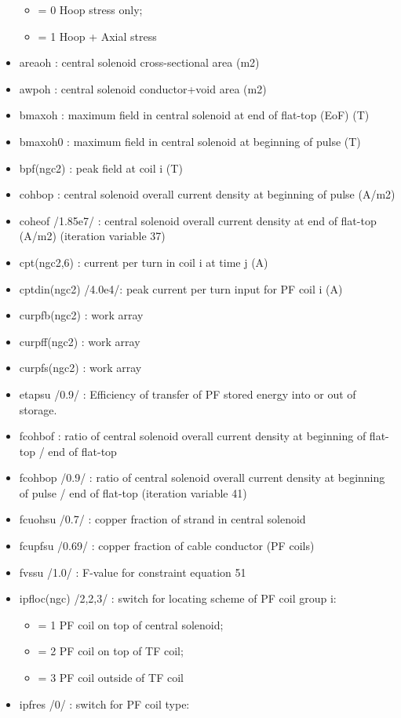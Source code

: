 \documentclass[]{article}
\providecommand{\tightlist}{%
  \setlength{\itemsep}{0pt}\setlength{\parskip}{0pt}}
\begin{document}
\begin{itemize}
  \begin{itemize}
  \tightlist
  \item
    = 0 Hoop stress only;
  \item
    = 1 Hoop + Axial stress
  \end{itemize}
\item
  areaoh : central solenoid cross-sectional area (m2)
\item
  awpoh : central solenoid conductor+void area (m2)
\item
  bmaxoh : maximum field in central solenoid at end of flat-top (EoF)
  (T)
\item
  bmaxoh0 : maximum field in central solenoid at beginning of pulse (T)
\item
  bpf(ngc2) : peak field at coil i (T)
\item
  cohbop : central solenoid overall current density at beginning of
  pulse (A/m2)
\item
  coheof /1.85e7/ : central solenoid overall current density at end of
  flat-top (A/m2) (iteration variable 37)
\item
  cpt(ngc2,6) : current per turn in coil i at time j (A)
\item
  cptdin(ngc2) /4.0e4/: peak current per turn input for PF coil i (A)
\item
  curpfb(ngc2) : work array
\item
  curpff(ngc2) : work array
\item
  curpfs(ngc2) : work array
\item
  etapsu /0.9/ : Efficiency of transfer of PF stored energy into or out
  of storage.
\item
  fcohbof : ratio of central solenoid overall current density at
  beginning of flat-top / end of flat-top
\item
  fcohbop /0.9/ : ratio of central solenoid overall current density at
  beginning of pulse / end of flat-top (iteration variable 41)
\item
  fcuohsu /0.7/ : copper fraction of strand in central solenoid
\item
  fcupfsu /0.69/ : copper fraction of cable conductor (PF coils)
\item
  fvssu /1.0/ : F-value for constraint equation 51
\item
  ipfloc(ngc) /2,2,3/ : switch for locating scheme of PF coil group i:

  \begin{itemize}
  \tightlist
  \item
    = 1 PF coil on top of central solenoid;
  \item
    = 2 PF coil on top of TF coil;
  \item
    = 3 PF coil outside of TF coil
  \end{itemize}
\item
  ipfres /0/ : switch for PF coil type:


\end{itemize}
\end{document}

